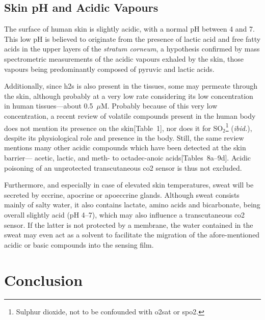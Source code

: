 \subsection{Skin pH and Acidic Vapours}\label{sect:tcco2:skin_mes:acid}

The surface of human skin is slightly acidic, with a normal pH between 4 and 7\cite{lambers2006}. This low pH is believed to originate from the presence of lactic acid and free fatty acids in the upper layers of the \textit{stratum corneum}, a hypothesis confirmed by mass spectrometric measurements of the acidic vapours exhaled by the skin, those vapours being predominantly composed of pyruvic and lactic acids\cite{martinez2009}.

Additionally, since \gls{h2s} is also present in the tissues, some may permeate through the skin, although probably at a very low rate considering its low concentration in human tissues---about 0.5~$\mu$M\cite{stein2013}. Probably because of this very low concentration, a recent review of volatile compounds present in the human body does not mention its presence on the skin\cite{delacy2014}[Table~1], nor does it for SO$_2$\footnote{Sulphur dioxide, not to be confounded with \gls{o2sat} or \gls{spo2}.} (\textit{ibid.}), despite its physiological role and presence in the body\cite{huang2015}. Still, the same review mentions many other acidic compounds which have been detected at the skin barrier---\eg{} acetic, lactic, and meth- to octadec-anoic acids\cite{delacy2014}[Tables~8a--9d]. Acidic poisoning of an unprotected transcutaneous \gls{co2} sensor is thus not excluded.

Furthermore, and especially in case of elevated skin temperatures, sweat will be secreted by eccrine, apocrine or apoeccrine glands. Although sweat consists mainly of salty water, it also contains lactate, amino acids and bicarbonate, being overall slightly acid (pH 4--7)\cite{baker2019}, which may also influence a transcutaneous \gls{co2} sensor. If the latter is not protected by a membrane, the water contained in the sweat may even act as a solvent to facilitate the migration of the afore-mentioned acidic or basic compounds into the sensing film.

\section{Conclusion}

